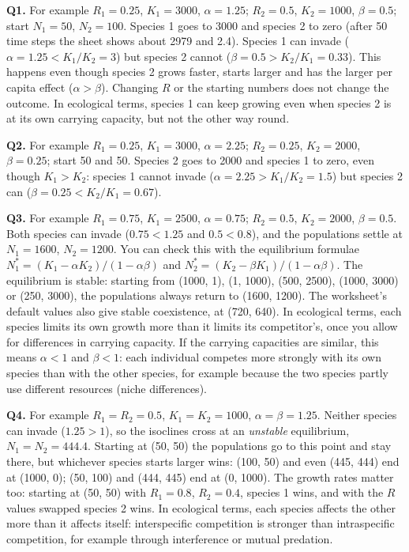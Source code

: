 \documentclass[
  a4paper]{book}
\begin{document}
\textbf{Q1.} For example \(R_1 = 0.25\), \(K_1 = 3000\), \(\alpha = 1.25\); \(R_2 = 0.5\), \(K_2 = 1000\), \(\beta = 0.5\); start \(N_1 = 50\), \(N_2 = 100\). Species 1 goes to 3000 and species 2 to zero (after 50 time steps the sheet shows about 2979 and 2.4). Species 1 can invade (\(\alpha = 1.25 < K_1/K_2 = 3\)) but species 2 cannot (\(\beta = 0.5 > K_2/K_1 = 0.33\)). This happens even though species 2 grows faster, starts larger and has the larger per capita effect (\(\alpha > \beta\)). Changing \(R\) or the starting numbers does not change the outcome. In ecological terms, species 1 can keep growing even when species 2 is at its own carrying capacity, but not the other way round.

\textbf{Q2.} For example \(R_1 = 0.25\), \(K_1 = 3000\), \(\alpha = 2.25\); \(R_2 = 0.25\), \(K_2 = 2000\), \(\beta = 0.25\); start 50 and 50. Species 2 goes to 2000 and species 1 to zero, even though \(K_1 > K_2\): species 1 cannot invade (\(\alpha = 2.25 > K_1/K_2 = 1.5\)) but species 2 can (\(\beta = 0.25 < K_2/K_1 = 0.67\)).

\textbf{Q3.} For example \(R_1 = 0.75\), \(K_1 = 2500\), \(\alpha = 0.75\); \(R_2 = 0.5\), \(K_2 = 2000\), \(\beta = 0.5\). Both species can invade (\(0.75 < 1.25\) and \(0.5 < 0.8\)), and the populations settle at \(N_1 = 1600\), \(N_2 = 1200\). You can check this with the equilibrium formulae \(N_1^* = (K_1 - \alpha K_2)/(1 - \alpha\beta)\) and \(N_2^* = (K_2 - \beta K_1)/(1 - \alpha\beta)\). The equilibrium is stable: starting from (1000, 1), (1, 1000), (500, 2500), (1000, 3000) or (250, 3000), the populations always return to (1600, 1200). The worksheet's default values also give stable coexistence, at (720, 640). In ecological terms, each species limits its own growth more than it limits its competitor's, once you allow for differences in carrying capacity. If the carrying capacities are similar, this means \(\alpha < 1\) and \(\beta < 1\): each individual competes more strongly with its own species than with the other species, for example because the two species partly use different resources (niche differences).

\textbf{Q4.} For example \(R_1 = R_2 = 0.5\), \(K_1 = K_2 = 1000\), \(\alpha = \beta = 1.25\). Neither species can invade (\(1.25 > 1\)), so the isoclines cross at an \emph{unstable} equilibrium, \(N_1 = N_2 = 444.4\). Starting at (50, 50) the populations go to this point and stay there, but whichever species starts larger wins: (100, 50) and even (445, 444) end at (1000, 0); (50, 100) and (444, 445) end at (0, 1000). The growth rates matter too: starting at (50, 50) with \(R_1 = 0.8\), \(R_2 = 0.4\), species 1 wins, and with the \(R\) values swapped species 2 wins. In ecological terms, each species affects the other more than it affects itself: interspecific competition is stronger than intraspecific competition, for example through interference or mutual predation.
\end{document}

